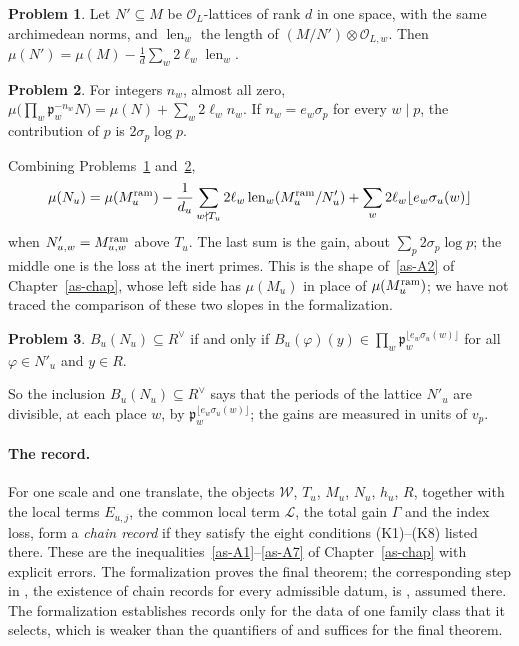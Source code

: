 \documentclass[reqno]{amsart}
\newcounter{chap}
\theoremstyle{definition}
\newtheorem{problem}{Problem}[section]
\theoremstyle{plain}
\theoremstyle{remark}
\newcommand{\Oc}{\mathcal O}
\newcommand{\Wc}{\mathcal W}
\newcommand{\pp}{\mathfrak p}
\newcommand{\len}{\operatorname{len}}
\begin{document}
\begin{problem}\label{pr:index-slope}
Let \(N'\subseteq M\) be \(\Oc_L\)-lattices of rank \(d\) in one space, with the same archimedean norms, and \(\len_w\) the length of \((M/N')\otimes\Oc_{L,w}\).  Then \(\mu(N')=\mu(M)-\frac1d\sum_w2\ell_w\len_w\).
\end{problem}

\begin{problem}\label{pr:rescale}
For integers \(n_w\), almost all zero, \(\mu\bigl(\prod_w\pp_w^{-n_w}N\bigr)=\mu(N)+\sum_w2\ell_wn_w\).  If \(n_w=e_w\sigma_p\) for every \(w\mid p\), the contribution of \(p\) is \(2\sigma_p\log p\).
\end{problem}

Combining Problems~\ref{pr:index-slope} and~\ref{pr:rescale},
\[
 \mu(N_u)=\mu(M_u^{\rm ram})-\frac1{d_u}\sum_{w\nmid T_u}2\ell_w\len_w(M_u^{\rm ram}/N'_u)+\sum_w2\ell_w\lfloor e_w\sigma_u(w)\rfloor
\]
when \(N'_{u,w}=M^{\rm ram}_{u,w}\) above \(T_u\).  The last sum is the gain, about \(\sum_p2\sigma_p\log p\); the middle one is the loss at the inert primes.  This is the shape of~\eqref{as-A2} of Chapter~\ref{as-chap}, whose left side has \(\mu(M_u)\) in place of \(\mu(M_u^{\rm ram})\); we have not traced the comparison of these two slopes in the formalization.

\begin{problem}\label{pr:periods}
\(B_u(N_u)\subseteq R^\vee\) if and only if \(B_u(\varphi)(y)\in\prod_w\pp_w^{\lfloor e_w\sigma_u(w)\rfloor}\) for all \(\varphi\in N'_u\) and \(y\in R\).
\end{problem}

So the inclusion \(B_u(N_u)\subseteq R^\vee\) says that the periods of the lattice \(N'_u\) are divisible, at each place \(w\), by \(\pp_w^{\lfloor e_w\sigma_u(w)\rfloor}\); the gains are measured in units of \(v_p\).

\paragraph{The record.}  For one scale and one translate, the objects \(\Wc\), \(T_u\), \(M_u\), \(N_u\), \(h_u\), \(R\), together with the local terms \(E_{u,j}\), the common local term \(\mathcal L\), the total gain \(\Gamma\) and the index loss, form a \emph{chain record} \cite[Def.~18.9]{Adr} if they satisfy the eight conditions (K1)--(K8) listed there.  These are the inequalities~\eqref{as-A1}--\eqref{as-A7} of Chapter~\ref{as-chap} with explicit errors.  The formalization proves the final theorem; the corresponding step in \cite{Adr}, the existence of chain records for every admissible datum, is \cite[Hyp.~18.10]{Adr}, assumed there.  The formalization establishes records only for the data of one family class that it selects, which is weaker than the quantifiers of \cite[Hyp.~18.10]{Adr} and suffices for the final theorem.
\end{document}
